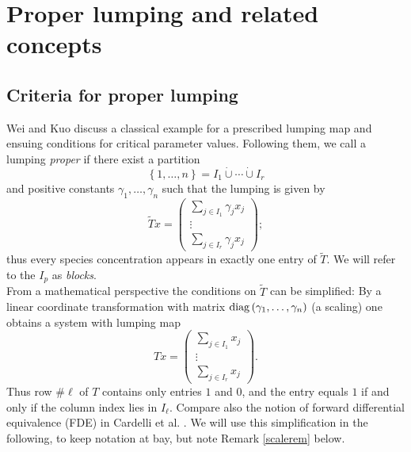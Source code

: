 \documentclass{article}
\begin{document}
\section{Proper lumping and related concepts}






\subsection{Criteria for proper lumping}\label{subsec:criteria}
Wei and Kuo \cite{WK1969a} discuss a classical example for a prescribed lumping map and ensuing conditions for critical parameter values. Following them, we call a lumping {\em proper} if there exist a partition
\[
\left\{1,\ldots,n\right\} =I_1\dot\cup\cdots\dot\cup I_r
\]
 and positive constants $\gamma_1,\ldots,\gamma_n$ such that the lumping is given by
\begin{equation}\label{properlumpmatgam}
\widetilde Tx=\begin{pmatrix} \sum_{j\in I_1} \gamma_j x_j \\ \vdots \\ \sum_{j\in I_r}\gamma_j x_j\end{pmatrix};
\end{equation}
thus every species concentration appears in exactly one entry of $\widetilde T$. We will refer to the $I_p$ as {\em blocks}. \\
From a mathematical perspective the conditions on $\widetilde T$ can be simplified: By a linear coordinate transformation with matrix ${\rm diag}\, (\gamma_1,\ldots,\gamma_n)$ (a scaling) one obtains a system with lumping map 
\begin{equation}\label{properlumpmat}
 Tx=\begin{pmatrix} \sum_{j\in I_1} x_j \\ \vdots \\ \sum_{j\in I_r} x_j\end{pmatrix}.
\end{equation}
Thus row $\# \ell$ of $T$ contains only entries $1$ and $0$, and the entry equals $1$ if and only if the column index lies in $I_\ell$. Compare also the notion of forward differential equivalence (FDE) in Cardelli et al. \cite{CardelliTTV2017}. We will use this simplification in the following, to keep notation at bay, but note Remark \ref{scalerem} below.\\ 
\end{document}
